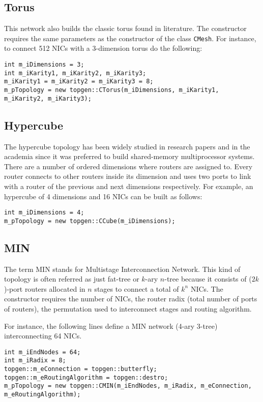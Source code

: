 \documentclass[12pt,onecolumn]{report}
\begin{document}
\subsection*{Torus}

This network also builds the classic torus found in literature. The constructor requires the same parameters as the constructor of the class \verb|CMesh|. For instance, to connect 512 NICs with a 3-dimension torus do the following:

\begin{lstlisting}
int m_iDimensions = 3;
int m_iKarity1, m_iKarity2, m_iKarity3;
m_iKarity1 = m_iKarity2 = m_iKarity3 = 8;
m_pTopology = new topgen::CTorus(m_iDimensions, m_iKarity1, m_iKarity2, m_iKarity3);
\end{lstlisting}

\subsection*{Hypercube}

The hypercube topology has been widely studied in research papers and in the academia since it was preferred to build shared-memory multiprocessor systems. There are a number of ordered dimensions where routers are assigned to. Every router connects to other routers inside its dimension and uses two ports to link with a router of the previous and next dimensions respectively. For example, an hypercube of 4 dimensions and 16 NICs can be built as follows:

\begin{lstlisting}
int m_iDimensions = 4;
m_pTopology = new topgen::CCube(m_iDimensions);
\end{lstlisting}

\subsection*{MIN}

The term MIN stands for Multistage Interconnection Network. This kind of topology is often referred as just fat-tree or $k$-ary $n$-tree because it consists of ($2k$)-port routers allocated in $n$ stages to connect a total of $k^n$ NICs. The constructor requires the number of NICs, the router radix (total number of ports of routers), the permutation used to interconnect stages and routing algorithm. 

For instance, the following lines define a MIN network (4-ary 3-tree) interconnecting 64 NICs. 
\begin{lstlisting}
int m_iEndNodes = 64;
int m_iRadix = 8;
topgen::m_eConnection = topgen::butterfly;
topgen::m_eRoutingAlgorithm = topgen::destro;
m_pTopology = new topgen::CMIN(m_iEndNodes, m_iRadix, m_eConnection, m_eRoutingAlgorithm);
\end{lstlisting}
\end{document}
